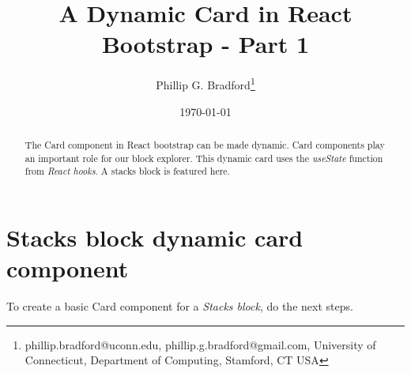 \documentclass[12pt]{article}
\begin{document}
\title{A Dynamic {\bf Card} in React Bootstrap - Part 1}
\author{
Phillip G. Bradford\thanks{phillip.bradford@uconn.edu, phillip.g.bradford@gmail.com,
{\sc University of Connecticut, Department of Computing, Stamford, CT USA}}
}

\date{\small\today}

\maketitle

%
%
%
\begin{abstract}
The Card component in React bootstrap can be made dynamic.
Card components play an important role for our block explorer.
This dynamic card uses the {\em useState} function from {\em React hooks}.
A stacks block is featured here.
\end{abstract}

%
%
%
%
\section{Stacks block dynamic card component}
\label{Basic Card component}


To create a basic Card component for a {\em Stacks block}, do the next steps.
\end{document}
